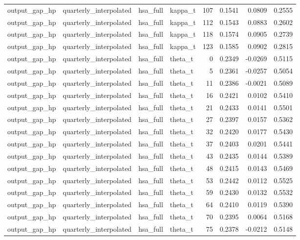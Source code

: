 \begin{tabular}{llllrrrr}
output\_gap\_hp & quarterly\_interpolated & hsa\_full & kappa\_t & 107 & 0.1541 & 0.0809 & 0.2555 \\
output\_gap\_hp & quarterly\_interpolated & hsa\_full & kappa\_t & 112 & 0.1543 & 0.0883 & 0.2602 \\
output\_gap\_hp & quarterly\_interpolated & hsa\_full & kappa\_t & 118 & 0.1574 & 0.0905 & 0.2739 \\
output\_gap\_hp & quarterly\_interpolated & hsa\_full & kappa\_t & 123 & 0.1585 & 0.0902 & 0.2815 \\
output\_gap\_hp & quarterly\_interpolated & hsa\_full & theta\_t & 0 & 0.2349 & -0.0269 & 0.5115 \\
output\_gap\_hp & quarterly\_interpolated & hsa\_full & theta\_t & 5 & 0.2361 & -0.0257 & 0.5054 \\
output\_gap\_hp & quarterly\_interpolated & hsa\_full & theta\_t & 11 & 0.2386 & -0.0021 & 0.5089 \\
output\_gap\_hp & quarterly\_interpolated & hsa\_full & theta\_t & 16 & 0.2421 & 0.0102 & 0.5410 \\
output\_gap\_hp & quarterly\_interpolated & hsa\_full & theta\_t & 21 & 0.2433 & 0.0141 & 0.5501 \\
output\_gap\_hp & quarterly\_interpolated & hsa\_full & theta\_t & 27 & 0.2397 & 0.0157 & 0.5362 \\
output\_gap\_hp & quarterly\_interpolated & hsa\_full & theta\_t & 32 & 0.2420 & 0.0177 & 0.5430 \\
output\_gap\_hp & quarterly\_interpolated & hsa\_full & theta\_t & 37 & 0.2403 & 0.0201 & 0.5441 \\
output\_gap\_hp & quarterly\_interpolated & hsa\_full & theta\_t & 43 & 0.2435 & 0.0144 & 0.5389 \\
output\_gap\_hp & quarterly\_interpolated & hsa\_full & theta\_t & 48 & 0.2415 & 0.0143 & 0.5469 \\
output\_gap\_hp & quarterly\_interpolated & hsa\_full & theta\_t & 53 & 0.2442 & 0.0112 & 0.5525 \\
output\_gap\_hp & quarterly\_interpolated & hsa\_full & theta\_t & 59 & 0.2430 & 0.0132 & 0.5532 \\
output\_gap\_hp & quarterly\_interpolated & hsa\_full & theta\_t & 64 & 0.2410 & 0.0119 & 0.5390 \\
output\_gap\_hp & quarterly\_interpolated & hsa\_full & theta\_t & 70 & 0.2395 & 0.0064 & 0.5168 \\
output\_gap\_hp & quarterly\_interpolated & hsa\_full & theta\_t & 75 & 0.2378 & -0.0212 & 0.5148 \\

\end{tabular}
